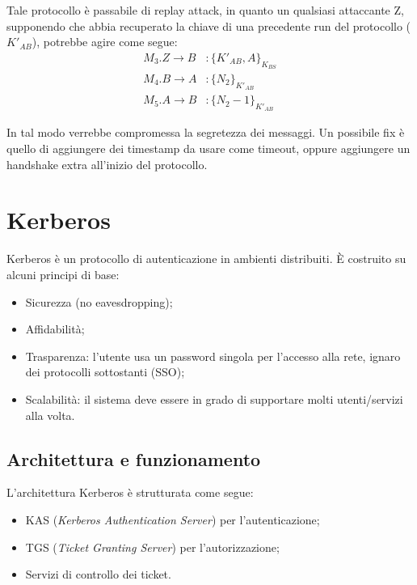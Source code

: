 \documentclass[a4paper, 11pt, twoside]{article}
\begin{document}
	Tale protocollo è passabile di replay attack, in quanto un qualsiasi attaccante Z, supponendo che abbia recuperato la chiave di una precedente run del protocollo ($K'_{AB}$), potrebbe agire come segue:
	\begin{align*}
		M_3. Z \to B&: \lbrace K'_{AB}, A\rbrace_{K_{BS}} \\
		M_4. B \to A&: \lbrace N_2\rbrace_{K'_{AB}}\\
		M_5. A \to B&: \lbrace N_2-1\rbrace_{K'_{AB}}
	\end{align*}
	
	In tal modo verrebbe compromessa la segretezza dei messaggi. Un possibile fix è quello di aggiungere dei timestamp da usare come timeout, oppure aggiungere un handshake extra all'inizio del protocollo.
	
	\section{Kerberos}
	Kerberos è un protocollo di autenticazione in ambienti distribuiti. È costruito su alcuni principi di base: \begin{itemize}
		\item Sicurezza (no eavesdropping);
		\item Affidabilità;
		\item Trasparenza: l'utente usa un password singola per l'accesso alla rete, ignaro dei protocolli sottostanti (SSO);
		\item Scalabilità: il sistema deve essere in grado di supportare molti utenti/servizi alla volta.
	\end{itemize}
	
	\subsection{Architettura e funzionamento}
	L'architettura Kerberos è strutturata come segue: \begin{itemize}
		\item KAS (\textit{Kerberos Authentication Server}) per l'autenticazione;
		\item TGS (\textit{Ticket Granting Server}) per l'autorizzazione;
		\item Servizi di controllo dei ticket.
	\end{itemize}
	
\end{document}
